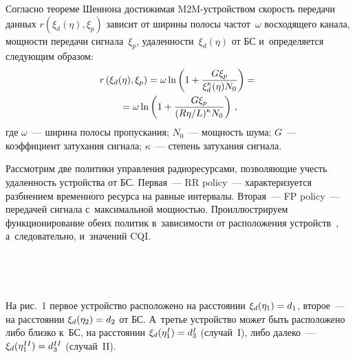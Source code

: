 \begin{multicols}{2}
  Согласно теореме Шеннона достижимая M2M-устрой\-ст\-вом скорость 
передачи данных $r(\xi_d(\eta),\xi_p)$ зависит от ширины полосы 
частот~$\omega$ восходящего канала, мощности передачи сигнала~$\xi_p$, 
уда\-лен\-ности~$\xi_d(\eta)$ от БС и~определяется следующим образом:
  \begin{multline*}
  r\left( \xi_d(\eta),\xi_p\right) = 
  \omega\ln \left( 1+\displaystyle\frac{\displaystyle G\xi_p\mathstrut}{\displaystyle \xi_d^\kappa(\eta) 
N_0\mathstrut}\right) ={}\\
{}=\omega \ln \left( 1+ \displaystyle\frac{\displaystyle G\xi_p\mathstrut}{\displaystyle (R\eta/L)^\kappa N_0\mathstrut}\right)\,,
  \end{multline*}
где $\omega$~--- ширина полосы пропускания; $N_0$~--- мощность шума; 
$G$~--- коэффициент затухания сигнала; $\kappa$~--- степень затухания 
сигнала.    

  Рассмотрим две политики управления радиоресурсами, позволяющие учесть 
удаленность устройства от БС. Первая~--- RR policy~--- 
характеризуется разбиением временн$\acute{\mbox{о}}$го ресурса на равные интервалы. 
Вторая~--- FP policy~--- передачей сигнала с~максимальной мощностью. 
Проиллюстрируем функционирование обеих политик в~зависимости от 
расположения устройств~\cite{10-gud, 11-gud, 12-gud}, а~следовательно, 
и~значений CQI.

\setcounter{figure}{1}
\begin{figure*}[b] %
\vspace*{1pt}
 \begin{center}  
  \mbox{%
 \epsfxsize=163mm 
 }
\end{center}
\vspace*{-11pt}
 \begin{center}  
  \mbox{%
 \epsfxsize=163mm 
 }
\end{center}
\vspace*{-11pt}
\end{figure*}

  
  На рис.~1 первое устройство расположено на расстоянии 
$\xi_d(\eta_1)\hm=d_1$, второе~--- на расстоянии $\xi_d(\eta_2)\hm=d_2$ от БС. 
А~третье устройство может быть расположено либо близко к~БС, на расстоянии 
$\xi_d(\eta_1^I)\hm= d_3^I$ (случай~I), либо далеко~--- $\xi_d(\eta_1^{II})\hm= 
d_3^{II}$ (случай~II).




\end{multicols}
